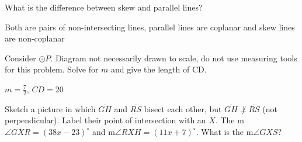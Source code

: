\begin{exercises}
\newpage	

	\begin{ex} \e What is the difference between skew and parallel lines?
	\medskip	
	\begin{sol}
	Both are pairs of non-intersecting lines, parallel lines are coplanar and skew lines are non-coplanar
	\end{sol}
	\end{ex}
	
\begin{ex} Consider $\odot P$.  Diagram not necessarily drawn to scale, do not use measuring tools for this problem.  Solve for $m$ and give the length of \seg CD.

\begin{flushright}
\end{flushright}

	\begin{sol}
	$m=\frac{7}{2}$, $CD = 20$
	\end{sol}
	\end{ex}
	
	\begin{ex} Sketch a picture in which $\overline{GH}$ and $\overline{RS}$ bisect each other, but $\overline{GH} \not\perp \overline{RS}$ (not perpendicular).  Label their point of intersection with an $X$.  The m$\angle GXR = (38x-23)^\circ$ and m$\angle RXH = (11x+7)^\circ$.  What is the m$\angle GXS$?

	\begin{sol} \hfill \\
\end{sol}
\end{ex}
\end{exercises}
